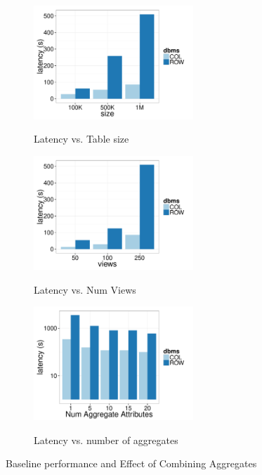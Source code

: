 \begin{figure}[t]
	\centering
	\begin{subfigure}{0.33\linewidth}
		{\includegraphics[width=6cm] {Images/baselines_by_size.pdf}}
		\caption{Latency vs. Table size}
		\label{fig:baseline_size}
	\end{subfigure}
	\begin{subfigure}{0.33\linewidth}
		\centering
		{\includegraphics[width=6cm] {Images/baselines_by_views.pdf}}
		\caption{Latency vs. Num Views}
		\label{fig:baseline_views}
	\end{subfigure}
	\begin{subfigure}{0.33\linewidth}
		{\includegraphics[width=6cm] {Images/multi_agg.pdf}}
		\caption{Latency vs. number of aggregates}
		\label{fig:multi_agg}
	\end{subfigure}
	\vspace{-10pt}
	\caption{Baseline performance and Effect of Combining Aggregates }
	\vspace{-10pt}
	\label{fig:bank_perf}
\end{figure}

